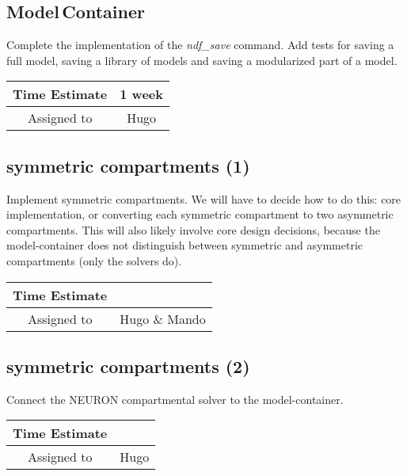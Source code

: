 \documentclass[12pt]{article}
\begin{document}
\subsection{Model\,Container}
Complete the implementation of the {\it ndf\_save} command.  Add tests for
saving a full model, saving a library of models and saving a
modularized part of a model.

\begin{center}
  \vspace{5mm}
  \centering
  \begin{tabular}{|c|c|}
    \hline
    Time Estimate
    & 1 week \\
    \hline
    Assigned to
    & Hugo \\
    \hline
  \end{tabular}
\end{center}


\subsection{symmetric compartments (1)}

Implement symmetric compartments.  We will have to decide how to do
this: core implementation, or converting each symmetric compartment to
two asymmetric compartments.  This will also likely involve core
design decisions, because the model-container does not distinguish
between symmetric and asymmetric compartments (only the solvers do).

\begin{center}
  \vspace{5mm}
  \centering
  \begin{tabular}{|c|c|}
    \hline
    Time Estimate
    & \\
    \hline
    Assigned to
    & Hugo \& Mando \\
    \hline
  \end{tabular}
\end{center}


\subsection{symmetric compartments (2)}

Connect the NEURON compartmental solver to the model-container.

\begin{center}
  \vspace{5mm}
  \centering
  \begin{tabular}{|c|c|}
    \hline
    Time Estimate
    & \\
    \hline
    Assigned to
    & Hugo \\
    \hline
  \end{tabular}
\end{center}
\end{document}
